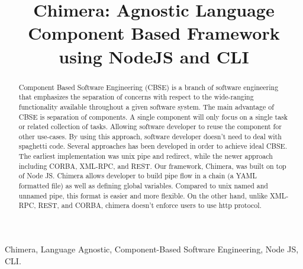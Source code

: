 \documentclass[conference]{IEEEtran}
\begin{document}
\title{Chimera: Agnostic Language Component Based Framework using NodeJS and CLI}

\author{
\and
{}
\and
{}
}

\maketitle


\begin{abstract}
    Component Based Software Engineering (CBSE) is a branch of software engineering that emphasizes the separation of concerns with respect to the wide-ranging functionality available throughout a given software system.  The main advantage of CBSE is separation of components. A single component will only focus on a single task or related collection of tasks. Allowing software developer to reuse the component for other use-cases. By using this approach, software developer doesn't need to deal with spaghetti code. Several approaches has been developed in order to achieve ideal CBSE. The earliest implementation was unix pipe and redirect, while the newer approach including CORBA, XML-RPC, and REST. Our framework, Chimera, was built on top of Node JS. Chimera allows developer to build pipe flow in a chain (a YAML formatted file) as well as defining global variables. Compared to unix named and unnamed pipe, this format is easier and more flexible. On the other hand, unlike XML-RPC, REST, and CORBA, chimera doesn't enforce users to use http protocol.
\end{abstract}

\begin{IEEEkeywords}
Chimera, Language Agnostic, Component-Based Software Engineering, Node JS, CLI.
\end{IEEEkeywords}

\IEEEpeerreviewmaketitle
\end{document}
